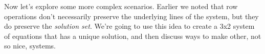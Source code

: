 \documentclass{ximera}
\begin{document}
    
    
    Now let's explore some more complex scenarios. Earlier we noted that row operations don't necessarily preserve the underlying lines of the system, but they do preserve the \emph{solution set}. We're going to use this idea to create a 3x2 system of equations that has a unique solution, and then discuss ways to make other, not so nice, systems.
    
    
    
    
    
    
    
    
    
\end{document}
